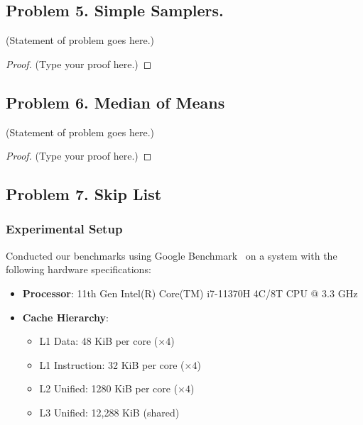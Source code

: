 \documentclass[12pt]{article}
\begin{document}
	\vspace{2in} %
	
	
	\subsection*{Problem 5. Simple Samplers.}
	(Statement of problem goes here.)\\
	
	\begin{proof}
		(Type your proof here.)
	\end{proof}
	
	\vspace{2in} %
	
	
	\subsection*{Problem 6. Median of Means}
	(Statement of problem goes here.)\\
	
	\begin{proof}
		(Type your proof here.)
	\end{proof}
	
	\vspace{2in} %
	
	\pagebreak


	\subsection*{Problem 7. Skip List}
	\vspace{20pt}
	\subsubsection*{Experimental Setup}
	Conducted our benchmarks using Google Benchmark~\cite{google-bench} on a system with the following hardware specifications:

\begin{itemize}
	\small
    \item \textbf{Processor}: 11th Gen Intel(R) Core(TM) i7-11370H 4C/8T CPU @ 3.3 GHz
    \item \textbf{Cache Hierarchy}:
    \begin{itemize}
        \item L1 Data: 48 KiB per core (\(\times 4\))
        \item L1 Instruction: 32 KiB per core (\(\times 4\))
        \item L2 Unified: 1280 KiB per core (\(\times 4\))
        \item L3 Unified: 12,288 KiB (shared)
    \end{itemize}
\end{itemize}
\end{document}
